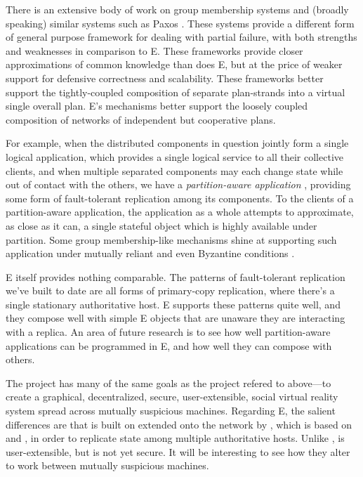 \documentclass{llncs}
\begin{document}
 There is an extensive body of work
on group membership systems \cite{birman:vsync,amir:thesis} and
(broadly speaking) similar systems such as Paxos
\cite{lamport:paxos}. These systems provide a different form of
general purpose framework for dealing with partial failure, with both
strengths and weaknesses in comparison to E. These frameworks provide
closer approximations of common knowledge than does E, but at the
price of weaker support for defensive correctness and scalability. These
frameworks better support the tightly-coupled composition of separate
plan-strands into a virtual single overall plan. E's mechanisms better
support the loosely coupled composition of networks of independent but
cooperative plans.

For example, when the distributed components in question jointly form
a single logical application, which provides a single logical service
to all their collective clients, and when multiple separated
components may each change state while out of contact with the others,
we have a \emph{partition-aware application}
\cite{partition-aware,bancomat}, providing some form of fault-tolerant
replication among its components. To the clients of a partition-aware
application, the application as a whole attempts to approximate, as
close as it can, a single stateful object which is highly available
under partition. Some group membership-like mechanisms shine at
supporting such application under mutually reliant and even Byzantine
conditions \cite{castro:bft}.

E itself provides nothing comparable. The patterns of fault-tolerant
replication we've built to date are all forms of primary-copy
replication, where there's a single stationary authoritative host. E
supports these patterns quite well, and they compose well with simple
E objects that are unaware they are interacting with a replica. An
area of future research is to see how well partition-aware
applications can be programmed in E, and how well they can compose
with others.

 The  project has
many of the same goals as the  project refered to
above---to create a graphical, decentralized, secure, user-extensible,
social virtual reality system spread across mutually suspicious
machines. Regarding E, the salient differences are that 
is built on  extended onto the network by
, which is based on  \cite{reed:namos} and
 \cite{lamport:paxos}, in order to replicate state among
multiple authoritative hosts. Unlike ,  is
user-extensible, but is not yet secure. It will be interesting to see
how they alter  to work between mutually suspicious
machines.
\end{document}
